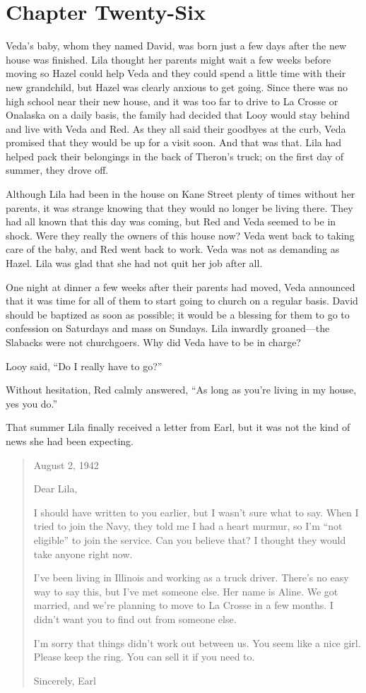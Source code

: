 \documentclass[
  letterpaper,
]{book}
\begin{document}

\chapter{Chapter Twenty-Six}\label{chapter-twenty-six}

Veda's baby, whom they named David, was born just a few days after the
new house was finished. Lila thought her parents might wait a few weeks
before moving so Hazel could help Veda and they could spend a little
time with their new grandchild, but Hazel was clearly anxious to get
going. Since there was no high school near their new house, and it was
too far to drive to La Crosse or Onalaska on a daily basis, the family
had decided that Looy would stay behind and live with Veda and Red. As
they all said their goodbyes at the curb, Veda promised that they would
be up for a visit soon. And that was that. Lila had helped pack their
belongings in the back of Theron's truck; on the first day of summer,
they drove off.

Although Lila had been in the house on Kane Street plenty of times
without her parents, it was strange knowing that they would no longer be
living there. They had all known that this day was coming, but Red and
Veda seemed to be in shock. Were they really the owners of this house
now? Veda went back to taking care of the baby, and Red went back to
work. Veda was not as demanding as Hazel. Lila was glad that she had not
quit her job after all.

One night at dinner a few weeks after their parents had moved, Veda
announced that it was time for all of them to start going to church on a
regular basis. David should be baptized as soon as possible; it would be
a blessing for them to go to confession on Saturdays and mass on
Sundays. Lila inwardly groaned---the Slabacks were not churchgoers. Why
did Veda have to be in charge?

Looy said, ``Do I really have to go?''

Without hesitation, Red calmly answered, ``As long as you're living in
my house, yes you do.''

That summer Lila finally received a letter from Earl, but it was not the
kind of news she had been expecting.

\begin{quote}
August 2, 1942

Dear Lila,

I should have written to you earlier, but I wasn't sure what to say.
When I tried to join the Navy, they told me I had a heart murmur, so I'm
``not eligible'' to join the service. Can you believe that? I thought
they would take anyone right now.

I've been living in Illinois and working as a truck driver. There's no
easy way to say this, but I've met someone else. Her name is Aline. We
got married, and we're planning to move to La Crosse in a few months. I
didn't want you to find out from someone else.

I'm sorry that things didn't work out between us. You seem like a nice
girl. Please keep the ring. You can sell it if you need to.

Sincerely, Earl
\end{quote}
\end{document}
